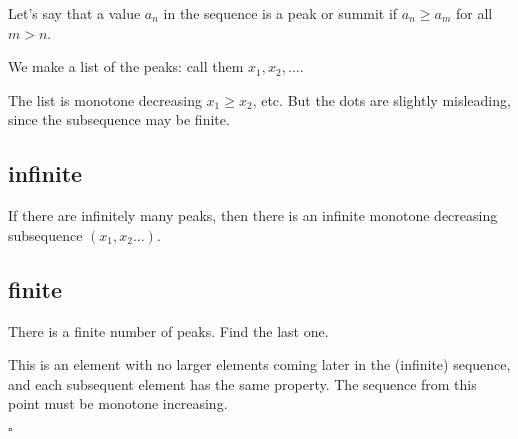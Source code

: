 \documentclass[11pt, oneside]{article}
\begin{document}
Let's say that a value $a_n$ in the sequence is a peak or summit if $a_n \ge a_m$ for all $m > n$.  

We make a list of the peaks:  call them $x_1, x_2, \dots$.  

The list is monotone decreasing $x_1 \ge x_2$, etc.  But the dots are slightly misleading, since the subsequence may be finite.

\subsection*{infinite}

If there are infinitely many peaks, then there is an infinite monotone decreasing subsequence $(x_1, x_2 \dots)$. 

\subsection*{finite}

There is a finite number of peaks.  Find the last one.  

This is an element with no larger elements coming later in the (infinite) sequence, and each subsequent element has the same property.  The sequence from this point must be monotone increasing.

$\square$
\end{document}
